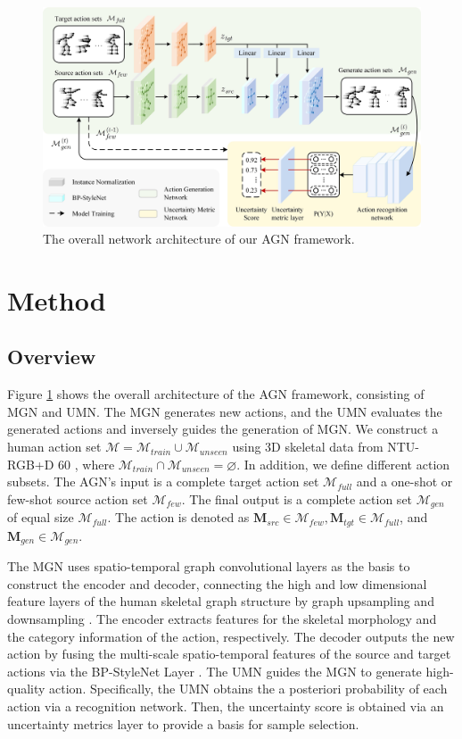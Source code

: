 
\begin{figure}[htpb]
  \centering
   \includegraphics[width=0.8\linewidth]{figures/Fig1.jpg}

   \caption{The overall network architecture of our AGN framework. }
   \label{fig:1}
\end{figure}

\section{Method}

\subsection{Overview}

Figure \ref{fig:1} shows the overall architecture of the AGN framework, consisting of MGN and UMN. 
The MGN generates new actions, and the UMN evaluates the generated actions and inversely guides the generation of MGN. 
We construct a human action set $\mathcal{M}=\mathcal{M}_{train}\cup \mathcal{M}_{unseen}$ using 3D skeletal data from NTU-RGB+D 60  \cite{shahroudy2016ntu}, where $\mathcal{M}_{train}\cap \mathcal{M}_{unseen}=\varnothing$. 
In addition, we define different action subsets. 
The AGN's input is a complete target action set $\mathcal{M}_{full}$ and a one-shot or few-shot source action set $\mathcal{M}_{few}$. The final output is a complete action set $\mathcal{M}_{gen}$ of equal size $\mathcal{M}_{full}$. The action is denoted as $\textbf{M}_{src}\in\mathcal{M}_{few}, \textbf{M}_{tgt}\in\mathcal{M}_{full}$, and $\textbf{M}_{gen}\in\mathcal{M}_{gen}$. 

The MGN uses spatio-temporal graph convolutional layers as the basis to construct the encoder and decoder, connecting the high and low dimensional feature layers of the human skeletal graph structure by graph upsampling and downsampling \cite{yan2019convolutional, jang2022motion}.
The encoder extracts features for the skeletal morphology and the category information of the action, respectively. The decoder outputs the new action by fusing the multi-scale spatio-temporal features of the source and target actions via the BP-StyleNet Layer \cite{jang2022motion}.
The UMN guides the MGN to generate high-quality action. 
Specifically, the UMN obtains the a posteriori probability of each action via a recognition network. Then, the uncertainty score is obtained via an uncertainty metrics layer to provide a basis for sample selection.

